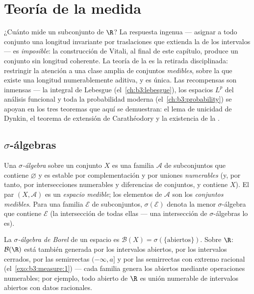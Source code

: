 \chapter{Teoría de la medida}\label{ch:b3:measure}

¿Cuánto mide un subconjunto de $\R$? La respuesta ingenua --- asignar a
todo conjunto una longitud invariante por traslaciones que extienda la
de los intervalos --- es \emph{imposible}: la construcción de Vitali, al
final de este capítulo, produce un conjunto sin longitud coherente. La
teoría de la  es la retirada
disciplinada: restringir la atención a una clase amplia de conjuntos
\emph{medibles}, sobre la que existe una longitud numerablemente
aditiva, y es única. Las recompensas son inmensas --- la integral de
Lebesgue (el~\cref{ch:b3:lebesgue}), los espacios $L^p$ del análisis
funcional y toda la probabilidad moderna (el~\cref{ch:b3:probability})
se apoyan en los tres teoremas que aquí se demuestran: el lema de
unicidad de Dynkin, el teorema de extensión de Carathéodory y la
existencia de la .

\section{$\sigma$-álgebras}

\begin{definition}\label{def:b3:measure:sigmaalgebra}
Una \emph{$\sigma$-álgebra} sobre
un conjunto $X$ es una familia $\mathcal A$ de subconjuntos que contiene
$\varnothing$ y es estable por complementación y por uniones
\emph{numerables} (y, por tanto, por intersecciones numerables y
diferencias de conjuntos, y contiene $X$). El par $(X, \mathcal A)$ es
un \emph{espacio medible}; los elementos de $\mathcal A$ son los
\emph{conjuntos medibles}. Para una familia $\mathcal E$ de
subconjuntos, $\sigma(\mathcal E)$ denota la menor $\sigma$-álgebra que
contiene $\mathcal E$ (la intersección de todas ellas --- una
intersección de $\sigma$-álgebras lo es).
\end{definition}

\begin{definition}\label{def:b3:measure:borel}
La \emph{$\sigma$-álgebra de Borel} de un espacio
 es
$\mathcal B(X) = \sigma(\{\text{abiertos}\})$. Sobre $\R$:
$\mathcal B(\R)$ está también generada por los intervalos abiertos, por
los intervalos cerrados, por las semirrectas $(-\infty, a]$ y por las
semirrectas con extremo racional (el~\cref{exo:b3:measure:1}) --- cada
familia genera los abiertos mediante operaciones numerables; por
ejemplo, todo abierto de $\R$ es
unión numerable de intervalos abiertos con datos racionales.
\end{definition}

